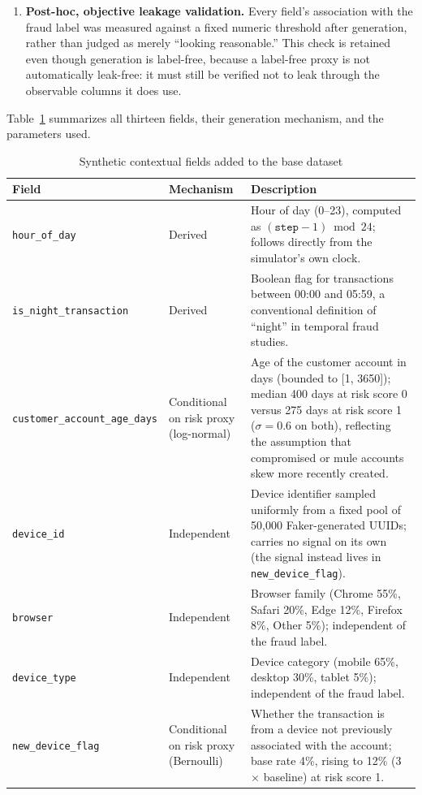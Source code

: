 \begin{enumerate}
    \item \textbf{Post-hoc, objective leakage validation.} Every field's association with the fraud label was measured against a fixed numeric threshold after generation, rather than judged as merely ``looking reasonable.'' This check is retained even though generation is label-free, because a label-free proxy is not automatically leak-free: it must still be verified not to leak through the observable columns it does use.
\end{enumerate}

Table~\ref{tab:synthetic-fields} summarizes all thirteen fields, their generation mechanism, and the parameters used.

\begin{table}[htbp]
\centering
\caption{Synthetic contextual fields added to the base dataset}
\label{tab:synthetic-fields}
\footnotesize
\begin{tabular}{@{}llp{7cm}@{}}
\toprule
\textbf{Field} & \textbf{Mechanism} & \textbf{Description} \\
\midrule
\texttt{hour\_of\_day} & Derived & Hour of day (0--23), computed as \((\texttt{step}-1) \bmod 24\); follows directly from the simulator's own clock. \\
\texttt{is\_night\_transaction} & Derived & Boolean flag for transactions between 00:00 and 05:59, a conventional definition of ``night'' in temporal fraud studies. \\
\texttt{customer\_account\_age\_days} & Conditional on risk proxy (log-normal) & Age of the customer account in days (bounded to [1, 3650]); median 400 days at risk score 0 versus 275 days at risk score 1 ($\sigma = 0.6$ on both), reflecting the assumption that compromised or mule accounts skew more recently created. \\
\texttt{device\_id} & Independent & Device identifier sampled uniformly from a fixed pool of 50,000 Faker-generated UUIDs; carries no signal on its own (the signal instead lives in \texttt{new\_device\_flag}). \\
\texttt{browser} & Independent & Browser family (Chrome 55\%, Safari 20\%, Edge 12\%, Firefox 8\%, Other 5\%); independent of the fraud label. \\
\texttt{device\_type} & Independent & Device category (mobile 65\%, desktop 30\%, tablet 5\%); independent of the fraud label. \\
\texttt{new\_device\_flag} & Conditional on risk proxy (Bernoulli) & Whether the transaction is from a device not previously associated with the account; base rate 4\%, rising to 12\% (3\(\times\) baseline) at risk score 1. \\

\end{tabular}
\end{table}
